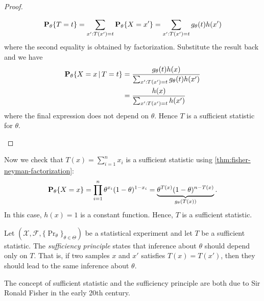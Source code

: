 \documentclass[a4paper]{article}
\begin{document}
\begin{proof}
\begin{itemize}
\begin{align*}
				\pr[\theta]{T=t}
				= \sum_{x' : T(x')=t} \pr[\theta]{X=x'}
				= \sum_{x' : T(x')=t} g_{\theta}(t) h(x')
			\end{align*}
			where the second equality is obtained by factorization.
			Substitute the result back and we have
			\begin{align*}
				\pr[\theta]{X=x\given T=t}
				&= \frac{ g_{\theta}(t) h(x) }{\sum_{x' : T(x')=t} g_{\theta}(t) h(x')} \\
				&= \frac{  h(x) }{\sum_{x' : T(x')=t} h(x')}
			\end{align*}
			where the final expression does not depend on $\theta$.
			Hence $T$ is a sufficient statistic for $\theta$.
			\qedhere
	\end{itemize}
\end{proof}

\begin{example}
	Now we check that $T(x)=\sum_{i=1}^{n}x_i$ is a sufficient statistic using \autoref{thm:fisher-neyman-factorization}:
	\begin{align*}
		\pr[\theta]{X=x}
		= \prod_{i=1}^{n} \theta^{x_i} (1-\theta)^{1-x_i}
		= \underbrace{\theta^{T(x)} (1-\theta)^{n-T(x)}}_{g_{\theta}(T(x))}.
	\end{align*}
	In this case, $h(x)=1$ is a constant function.
	Hence, $T$ is a sufficient statistic.
\end{example}

\begin{definition}
	Let $(\mathcal{X},\mathcal{F},\{\Pr_{\theta}\}_{\theta\in\Theta})$ be a statistical experiment and
	let $T$ be a sufficient statistic.
	The \emph{sufficiency principle} states that inference about $\theta$ should depend only on $T$.
	That is, if two samples $x$ and $x'$ satisfies $T(x)=T(x')$,
	then they should lead to the same inference about $\theta$.
\end{definition}

\begin{remark}
	The concept of sufficient statistic and the sufficiency principle
	are both due to Sir Ronald Fisher in the early 20th century.
\end{remark}

\printbibliography
\end{document}
